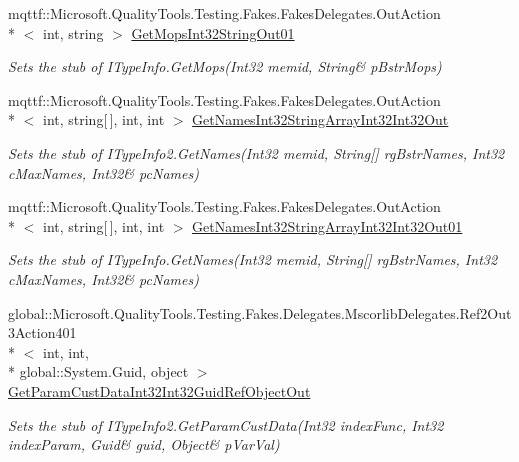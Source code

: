 \begin{DoxyCompactItemize}
mqttf\-::\-Microsoft.\-Quality\-Tools.\-Testing.\-Fakes.\-Fakes\-Delegates.\-Out\-Action\\*
$<$ int, string $>$ \hyperlink{class_system_1_1_runtime_1_1_interop_services_1_1_com_types_1_1_fakes_1_1_stub_i_type_info2_a5a3926ace3d6f53de5c0af6a09a54c4b}{Get\-Mops\-Int32\-String\-Out01}
\begin{DoxyCompactList}\small\item\em Sets the stub of I\-Type\-Info.\-Get\-Mops(Int32 memid, String\& p\-Bstr\-Mops)\end{DoxyCompactList}\item 
mqttf\-::\-Microsoft.\-Quality\-Tools.\-Testing.\-Fakes.\-Fakes\-Delegates.\-Out\-Action\\*
$<$ int, string\mbox{[}$\,$\mbox{]}, int, int $>$ \hyperlink{class_system_1_1_runtime_1_1_interop_services_1_1_com_types_1_1_fakes_1_1_stub_i_type_info2_ad1c14f2331e06bfb1990f0849ff18861}{Get\-Names\-Int32\-String\-Array\-Int32\-Int32\-Out}
\begin{DoxyCompactList}\small\item\em Sets the stub of I\-Type\-Info2.\-Get\-Names(Int32 memid, String\mbox{[}\mbox{]} rg\-Bstr\-Names, Int32 c\-Max\-Names, Int32\& pc\-Names)\end{DoxyCompactList}\item 
mqttf\-::\-Microsoft.\-Quality\-Tools.\-Testing.\-Fakes.\-Fakes\-Delegates.\-Out\-Action\\*
$<$ int, string\mbox{[}$\,$\mbox{]}, int, int $>$ \hyperlink{class_system_1_1_runtime_1_1_interop_services_1_1_com_types_1_1_fakes_1_1_stub_i_type_info2_a4d9a62f51763cea13d43cd07e0843809}{Get\-Names\-Int32\-String\-Array\-Int32\-Int32\-Out01}
\begin{DoxyCompactList}\small\item\em Sets the stub of I\-Type\-Info.\-Get\-Names(Int32 memid, String\mbox{[}\mbox{]} rg\-Bstr\-Names, Int32 c\-Max\-Names, Int32\& pc\-Names)\end{DoxyCompactList}\item 
global\-::\-Microsoft.\-Quality\-Tools.\-Testing.\-Fakes.\-Delegates.\-Mscorlib\-Delegates.\-Ref2\-Out3\-Action401\\*
$<$ int, int, \\*
global\-::\-System.\-Guid, object $>$ \hyperlink{class_system_1_1_runtime_1_1_interop_services_1_1_com_types_1_1_fakes_1_1_stub_i_type_info2_a98055cc10076e5e24c837194b0f411d2}{Get\-Param\-Cust\-Data\-Int32\-Int32\-Guid\-Ref\-Object\-Out}
\begin{DoxyCompactList}\small\item\em Sets the stub of I\-Type\-Info2.\-Get\-Param\-Cust\-Data(Int32 index\-Func, Int32 index\-Param, Guid\& guid, Object\& p\-Var\-Val)\end{DoxyCompactList}\item 

\end{DoxyCompactItemize}
